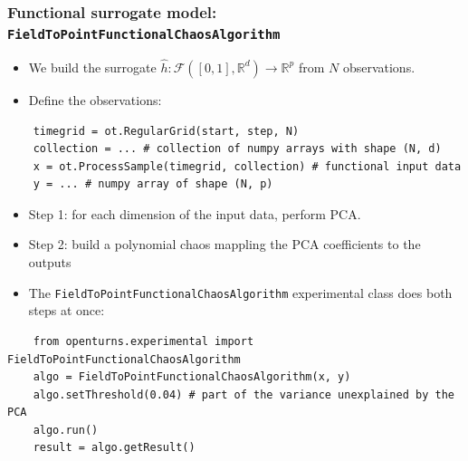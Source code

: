 \documentclass{beamer}
\begin{document}
  
  
  \begin{frame}[containsverbatim]
  \frametitle{Functional surrogate model: \texttt{FieldToPointFunctionalChaosAlgorithm}}
  
  \begin{itemize}
    \item We build the surrogate $\hat{h} : \mathcal{F}([0, 1], \mathbb{R}^d) \rightarrow \mathbb{R}^p$ from $N$ observations.
    \item Define the observations:
  \end{itemize}

    \begin{lstlisting}
    timegrid = ot.RegularGrid(start, step, N)
    collection = ... # collection of numpy arrays with shape (N, d)
    x = ot.ProcessSample(timegrid, collection) # functional input data
    y = ... # numpy array of shape (N, p)
    \end{lstlisting}
    
    \begin{itemize}
    \item Step 1: for each dimension of the input data, perform PCA.
    \item Step 2: build a polynomial chaos mappling the PCA coefficients to the outputs
    \item The \texttt{FieldToPointFunctionalChaosAlgorithm} experimental class does both steps at once:
    \end{itemize}

    \begin{lstlisting}
    from openturns.experimental import FieldToPointFunctionalChaosAlgorithm
    algo = FieldToPointFunctionalChaosAlgorithm(x, y)
    algo.setThreshold(0.04) # part of the variance unexplained by the PCA
    algo.run()
    result = algo.getResult()
    \end{lstlisting} 
  

  \end{frame}
  
  
  
\end{document}
